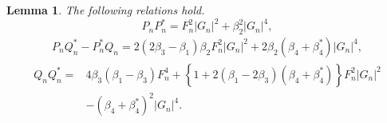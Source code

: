 \documentclass[10pt,leqno]{amsart}
\newtheorem{lem}[theorem]{Lemma}
\numberwithin{equation}{section}
\begin{document}
\begin{lem}\label{prop:PhDKalbi2}
The following relations hold.
\begin{equation}\label{66}
P_{n}P_{n}^{*}=F_{n}^{2}|G_{n}|^{2}+\beta_{2}^{2}|G_{n}|^{4},
\end{equation}
\begin{equation}\label{67}
\begin{split}
P_{n}Q_{n}^{*}-P_{n}^{*}Q_{n}=2\left(2\beta_{3}-\beta_{1}\right)\beta_{2} F_{n}^{2}|G_{n}|^{2}+2\beta_{2}\left(\beta_{4}+\beta_{4}^{*}\right)|G_{n}|^{4},
\end{split}
\end{equation}
\begin{equation}\label{68}
\begin{split}
Q_{n}Q_{n}^{*}=&4\beta_{3}\left(\beta_{1}-\beta_{3}\right)F_{n}^{4}+\left\{1+2\left(\beta_{1}-2\beta_{3}\right)\left(\beta_{4}+\beta_{4}^{*}\right)\right\}F_{n}^{2}|G_{n}|^{2}\\
&-\left(\beta_{4}+\beta_{4}^{*}\right)^{2}|G_{n}|^{4}.
\end{split}
\end{equation}
\end{lem}
\end{document}
